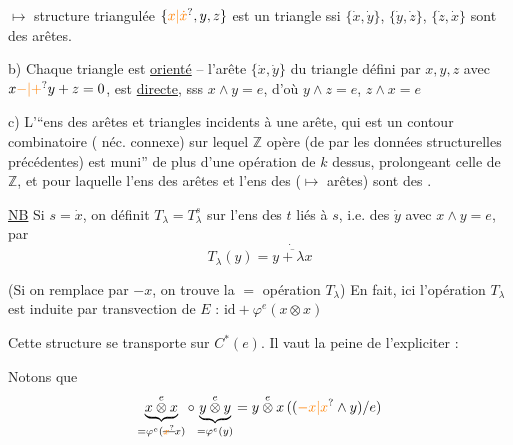 $\longmapsto$ structure triangulée $\{\unsure{x|\dot x},y,z\}$ est un triangle ssi $\{\dot x,\dot y\}$, $\{\dot y,\dot z\}$, $\{\dot z,\dot x\}$ sont des arêtes.


b) Chaque triangle est \uline{orienté} --  l'arête $\{\dot x,\dot y\}$ du triangle défini par $x,y,z$ avec $x\unsure{-|+}y+z=0$,  est \uline{directe}, sss $x\wedge y=e$, d'où $y\wedge z=e$, $z\wedge x=e$


c) L'``ens des arêtes et triangles incidents à une arête, qui est un contour combinatoire ( néc. connexe) sur lequel $\mathbb Z$ opère (de par les données structurelles précédentes) est muni'' de plus d'une opération de $k$ dessus, prolongeant celle de $\mathbb Z$, et pour laquelle l'ens des arêtes  et l'ens des  ($\longmapsto$ arêtes) sont des .

\uline{NB} Si $s=\dot x$,  on définit $T_\lambda=T_\lambda^s$ sur l'ens des $t$ liés à $s$, i.e. des $\dot y$ avec $x\wedge y=e$, par
\[
 T_\lambda(y)=\dot{\overline{y+\lambda x}}
\]


(Si on remplace  par $-x$, on trouve la $=$ opération $T_\lambda$) En fait, ici  l'opération $T_\lambda$ est induite par  transvection de $E$ :  $\mathrm{id}+\varphi^e(x\otimes x)$

Cette structure se transporte sur $C^*(e)$. Il vaut la peine de l'expliciter :

Notons que
\[
 \underbrace{x\overset{e}{\otimes}x}_{=\varphi^e(\deleted{\unsure{x}}x)}
 \circ\underbrace{y\overset{e}{\otimes}y}_{=\varphi^e(y)}
 =y\overset{e}{\otimes}x\,((\unsure{-x|x}\wedge y)/e)
\]

